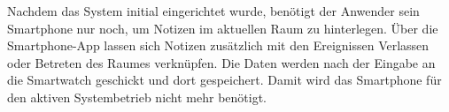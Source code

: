 Nachdem das System initial eingerichtet wurde, benötigt der Anwender sein Smartphone nur noch, um Notizen im aktuellen Raum zu hinterlegen. Über die Smartphone-App lassen sich Notizen zusätzlich mit den Ereignissen Verlassen oder Betreten des Raumes verknüpfen. Die Daten werden nach der Eingabe an die Smartwatch geschickt und dort gespeichert. Damit wird das Smartphone für den aktiven Systembetrieb nicht mehr benötigt.



